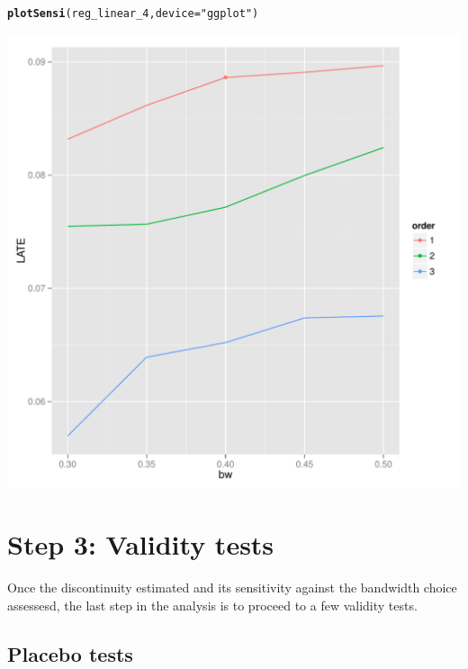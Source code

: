 \documentclass[english,nojss]{jss}\usepackage{graphicx, color}
\makeatletter
\def\maxwidth{ %
  \ifdim\Gin@nat@width>\linewidth
    \linewidth
  \else
    \Gin@nat@width
  \fi
}
\newcommand{\hlfunctioncall}[1]{\textcolor[rgb]{0.501960784313725,0,0.329411764705882}{\textbf{#1}}}%
\newcommand{\hlstring}[1]{\textcolor[rgb]{0.6,0.6,1}{#1}}%
\newenvironment{kframe}{%
 \def\at@end@of@kframe{}%
 \ifinner\ifhmode%
  \def\at@end@of@kframe{\end{minipage}}%
  \begin{minipage}{\columnwidth}%
 \fi\fi%
 \def\FrameCommand##1{\hskip\@totalleftmargin \hskip-\fboxsep
 \colorbox{shadecolor}{##1}\hskip-\fboxsep
     \hskip-\linewidth \hskip-\@totalleftmargin \hskip\columnwidth}%
 \MakeFramed {\advance\hsize-\width
   \@totalleftmargin\z@ \linewidth\hsize
   \@setminipage}}%
 {\par\unskip\endMakeFramed%
 \at@end@of@kframe}
\newenvironment{knitrout}{}{} %
\makeatother
\begin{document}
\begin{knitrout}
\color{fgcolor}\begin{kframe}
\begin{alltt}
\hlfunctioncall{plotSensi}(reg_linear_4, device = \hlstring{"ggplot"})
\end{alltt}
\end{kframe}
\includegraphics[width=\maxwidth]{figure/unnamed-chunk-14} 

\end{knitrout}



\section{Step 3: Validity tests}


Once the discontinuity estimated and its sensitivity against the bandwidth
choice assessesd, the last step in the analysis is to proceed to a
few validity tests. 


\subsection{Placebo tests}
\end{document}
